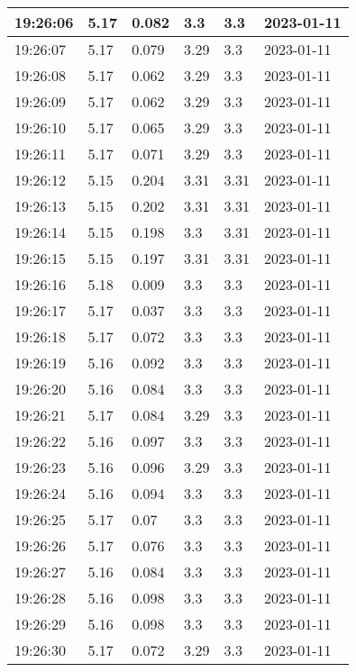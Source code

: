 \begin{longtable}{|l|l|l|l|l|l|}
        19:26:06 & 5.17 & 0.082 & 3.3 & 3.3 & 2023-01-11 \\ \hline
        19:26:07 & 5.17 & 0.079 & 3.29 & 3.3 & 2023-01-11 \\ \hline
        19:26:08 & 5.17 & 0.062 & 3.29 & 3.3 & 2023-01-11 \\ \hline
        19:26:09 & 5.17 & 0.062 & 3.29 & 3.3 & 2023-01-11 \\ \hline
        19:26:10 & 5.17 & 0.065 & 3.29 & 3.3 & 2023-01-11 \\ \hline
        19:26:11 & 5.17 & 0.071 & 3.29 & 3.3 & 2023-01-11 \\ \hline
        19:26:12 & 5.15 & 0.204 & 3.31 & 3.31 & 2023-01-11 \\ \hline
        19:26:13 & 5.15 & 0.202 & 3.31 & 3.31 & 2023-01-11 \\ \hline
        19:26:14 & 5.15 & 0.198 & 3.3 & 3.31 & 2023-01-11 \\ \hline
        19:26:15 & 5.15 & 0.197 & 3.31 & 3.31 & 2023-01-11 \\ \hline
        19:26:16 & 5.18 & 0.009 & 3.3 & 3.3 & 2023-01-11 \\ \hline
        19:26:17 & 5.17 & 0.037 & 3.3 & 3.3 & 2023-01-11 \\ \hline
        19:26:18 & 5.17 & 0.072 & 3.3 & 3.3 & 2023-01-11 \\ \hline
        19:26:19 & 5.16 & 0.092 & 3.3 & 3.3 & 2023-01-11 \\ \hline
        19:26:20 & 5.16 & 0.084 & 3.3 & 3.3 & 2023-01-11 \\ \hline
        19:26:21 & 5.17 & 0.084 & 3.29 & 3.3 & 2023-01-11 \\ \hline
        19:26:22 & 5.16 & 0.097 & 3.3 & 3.3 & 2023-01-11 \\ \hline
        19:26:23 & 5.16 & 0.096 & 3.29 & 3.3 & 2023-01-11 \\ \hline
        19:26:24 & 5.16 & 0.094 & 3.3 & 3.3 & 2023-01-11 \\ \hline
        19:26:25 & 5.17 & 0.07 & 3.3 & 3.3 & 2023-01-11 \\ \hline
        19:26:26 & 5.17 & 0.076 & 3.3 & 3.3 & 2023-01-11 \\ \hline
        19:26:27 & 5.16 & 0.084 & 3.3 & 3.3 & 2023-01-11 \\ \hline
        19:26:28 & 5.16 & 0.098 & 3.3 & 3.3 & 2023-01-11 \\ \hline
        19:26:29 & 5.16 & 0.098 & 3.3 & 3.3 & 2023-01-11 \\ \hline
        19:26:30 & 5.17 & 0.072 & 3.29 & 3.3 & 2023-01-11 \\ \hline

\end{longtable}
